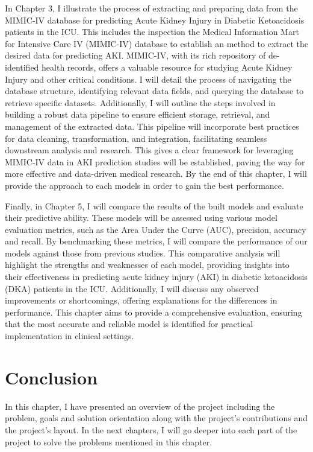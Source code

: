 \documentclass[../main.tex]{subfiles}
\begin{document}
In Chapter 3, I illustrate the process of extracting and preparing data from the MIMIC-IV database for predicting Acute Kidney Injury in Diabetic Ketoacidosis patients in the ICU.
This includes the inspection the Medical Information Mart for Intensive Care IV (MIMIC-IV) database to establish an method to extract the desired data for predicting AKI. 
MIMIC-IV, with its rich repository of de-identified health records, offers a valuable resource for studying Acute Kidney Injury and other critical conditions. 
I will detail the process of navigating the database structure, identifying relevant data fields, and querying the database to retrieve specific datasets. 
Additionally, I will outline the steps involved in building a robust data pipeline to ensure efficient storage, retrieval, and management of the extracted data. 
This pipeline will incorporate best practices for data cleaning, transformation, and integration, facilitating seamless downstream analysis and research. 
This gives a clear framework for leveraging MIMIC-IV data in AKI prediction studies will be established, paving the way for more effective and data-driven medical research.
By the end of this chapter, I will provide the approach to each models in order to gain the best performance.

Finally, in Chapter 5, I will compare the results of the built models and evaluate their predictive ability. 
These models will be assessed using various model evaluation metrics, such as the Area Under the Curve (AUC), precision, accuracy and recall. 
By benchmarking these metrics, I will compare the performance of our models against those from previous studies. 
This comparative analysis will highlight the strengths and weaknesses of each model, providing insights into their effectiveness in predicting acute kidney injury (AKI) in diabetic ketoacidosis (DKA) patients in the ICU. 
Additionally, I will discuss any observed improvements or shortcomings, offering explanations for the differences in performance. 
This chapter aims to provide a comprehensive evaluation, ensuring that the most accurate and reliable model is identified for practical implementation in clinical settings.


\section{Conclusion}
In this chapter, I have presented an overview of the project including the problem, goals and solution orientation along with the project's contributions and the project's layout.
In the next chapters, I will go deeper into each part of the project to solve the problems mentioned in this chapter.
\end{document}
